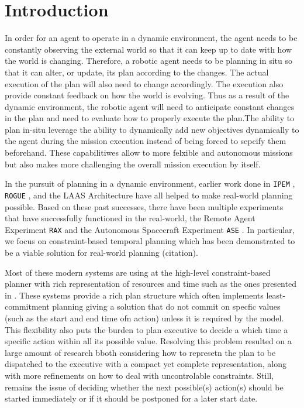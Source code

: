\section{Introduction}
\label{sec:intro}



In order for an agent to operate in a dynamic environment, the agent
needs to be constantly observing the external world so that it can
keep up to date with how the world is changing. Therefore, a robotic
agent needs to be planning in situ so that it can alter, or update,
its plan according to the changes. The actual execution of the plan
will also need to change accordingly. The execution also provide
constant feedback on how the world is evolving.  Thus as a result of
the dynamic environment, the robotic agent will need to anticipate
constant changes in the plan and need to evaluate how to properly
execute the plan.The ability to plan in-situ leverage the ability to
dynamically add new objectives dynamically to the agent during the
mission execution instead of being forced to sepcify them beforehand.
These capabilitiwes allow to more felxible and autonomous missions
but also makes more challenging the overall mission execution by itself. 


In the pursuit of planning in a dynamic environment, earlier work done
in \texttt{IPEM} \cite{AmbrosIngerson88}, \texttt{ROGUE}
\cite{Haigh98}, and the LAAS Architecture \cite{alami:1998p820} have
all helped to make real-world planning possible. Based on these past
successes, there have been multiple experiments that have successfully
functioned in the real-world, the Remote Agent Experiment \texttt{RAX}
\cite{mus98} and the Autonomous Spacecraft Experiment \texttt{ASE}
\cite{chien99}. In particular, we focus on constraint-based temporal
planning which has been demonstrated to be a viable solution for
real-world planning (citation).

Most of these modern systems are using at the high-level 
constraint-based planner with rich representation of resources 
and time such as the ones presented in \cite{frank2003,lemai04}. 
These systems provide a rich plan structure which often implements
least-commitment planning giving a solution that do not commit on
specfic values (such as the start and end time ofn action) unless it
is required by the model. This flexibility also puts the burden to
plan executive to decide a which time a specific action within all
its possible value. Resolving this problem resulted on a large amount
of research bboth considering how to represetn the plan to be
dispatched to the executive with a compact yet complete
representation, along with more refinements on how to deal with
uncontrolable constraints. Still, remains the issue of deciding 
whether the next possible(s) action(s) should be started immediately 
or if it should be postponed for a later start date. 


